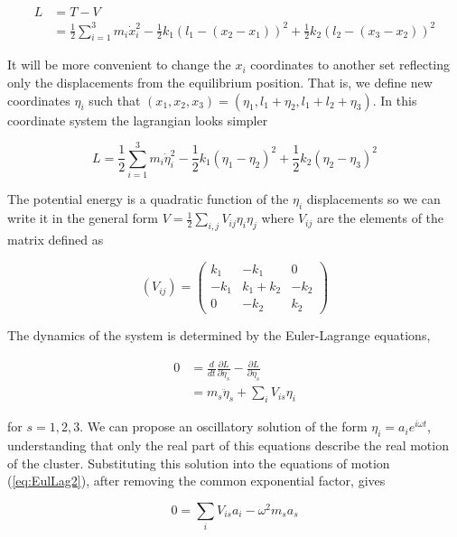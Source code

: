 \begin{align}
L & = T-V\\
  & = \frac{1}{2}\sum_{i=1}^3 m_i \dot{x}_i^2 - \frac{1}{2}k_1(l_1-(x_2-x_1))^2+\frac{1}{2}k_2(l_2-(x_3-x_2))^2
\end{align}

It will be more convenient to change the $x_i$ coordinates to another set reflecting only the displacements from the equilibrium position.
That is, we define new coordinates $\eta_i$ such that $(x_1,x_2,x_3)=(\eta_1,l_1+\eta_2,l_1+l_2+\eta_3)$. 
In this coordinate system the lagrangian looks simpler

\begin{equation}
  L= \frac{1}{2}\sum_{i=1}^3 m_i \dot{\eta}_i^2-\frac{1}{2}k_1(\eta_1-\eta_2)^2+\frac{1}{2}k_2(\eta_2-\eta_3)^2
\end{equation}

The potential energy is a quadratic function of the $\eta_i$ displacements so we can write it in the general form $V=\frac{1}{2}\sum_{i,j}V_{ij}\eta_i\eta_j$ where $V_{ij}$ are the elements of the matrix defined as

\begin{equation}
  (V_{ij})=\left( \begin{array}{ccc} k_1 & -k_1 & 0 \\ -k_1 & k_1+k_2 & -k_2 \\ 0 & -k_2 & k_2 \end{array} \right)
\end{equation}

The dynamics of the system is determined by the Euler-Lagrange equations,

\begin{align}
  0 & = \frac{d}{dt}\frac{\partial L}{\partial \dot{\eta}_s}-\frac{\partial L}{\partial \eta_s} \label{eq:EulLag1} \\
    & = m_s \ddot{\eta}_s + \sum_i V_{is} \eta_i \label{eq:EulLag2}
\end{align}

\noindent for $s=1,2,3$. 
We can propose an oscillatory solution of the form $\eta_i=a_ie^{i\omega t}$, understanding that only the real part of this equations describe the real motion of the cluster. 
Substituting this solution into the equations of motion (\ref{eq:EulLag2}), after removing the common exponential factor, gives

\begin{equation}
  0=\sum_i V_{is}a_i-\omega^2m_sa_s
\end{equation}

